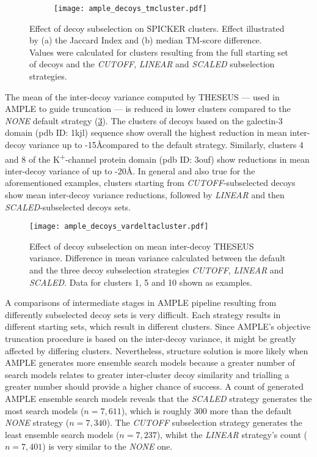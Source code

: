 \begin{figure}[H]\ContinuedFloat
    \begin{subfigure}[b]{\textwidth}
        \texttt{[image: ample\_decoys\_tmcluster.pdf]}
        \caption{}
        \label{fig:ample_decoys_tmcluster}
    \end{subfigure}
    \caption[Effect of decoy subselection on SPICKER clusters]{Effect of decoy subselection on SPICKER clusters. Effect illustrated by (a) the Jaccard Index and (b) median TM-score difference. Values were calculated for clusters resulting from the full starting set of decoys and the \textit{CUTOFF}, \textit{LINEAR} and \textit{SCALED} subselection strategies.}
\end{figure}

The mean of the inter-decoy variance computed by THESEUS --- used in AMPLE to guide truncation --- is reduced in lower clusters compared to the \textit{NONE} default strategy (\cref{fig:ample_decoys_vardeltacluster}). The clusters of decoys based on the galectin-3 domain (\gls{pdb} ID: 1kjl) sequence show overall the highest reduction in mean inter-decoy variance up to -15\AA compared to the default strategy. Similarly, clusters 4 and 8 of the K\textsuperscript{+}-channel protein domain (\gls{pdb} ID: 3ouf) show reductions in mean inter-decoy variance of up to -20\AA. In general and also true for the aforementioned examples, clusters starting from \textit{CUTOFF}-subselected decoys show mean inter-decoy variance reductions, followed by \textit{LINEAR} and then \textit{SCALED}-subselected decoys sets.

\begin{figure}[H]
    \centering
    \texttt{[image: ample\_decoys\_vardeltacluster.pdf]}
    \caption[Effect of decoy subselection on THESEUS variance]{Effect of decoy subselection on mean inter-decoy THESEUS variance. Difference in mean variance calculated between the default and the three decoy subselection strategies \textit{CUTOFF}, \textit{LINEAR} and \textit{SCALED}. Data for clusters 1, 5 and 10 shown as examples.}
    \label{fig:ample_decoys_vardeltacluster}
\end{figure}

A comparisons of intermediate stages in AMPLE pipeline resulting from differently subselected decoy sets is very difficult. Each strategy results in different starting sets, which result in different clusters. Since AMPLE's objective truncation procedure is based on the inter-decoy variance, it might be greatly affected by differing clusters. Nevertheless, structure solution is more likely when AMPLE generates more ensemble search models because a greater number of search models relates to greater inter-cluster decoy similarity and trialling a greater number should provide a higher chance of success. A count of generated AMPLE ensemble search models reveals that the \textit{SCALED} strategy generates the most search models ($n=7,611$), which is roughly 300 more than the default \textit{NONE} strategy ($n=7,340$). The \textit{CUTOFF} subselection strategy generates the least ensemble search models ($n=7,237$), whilst the \textit{LINEAR} strategy's count ($n=7,401$) is very similar to the \textit{NONE} one.

